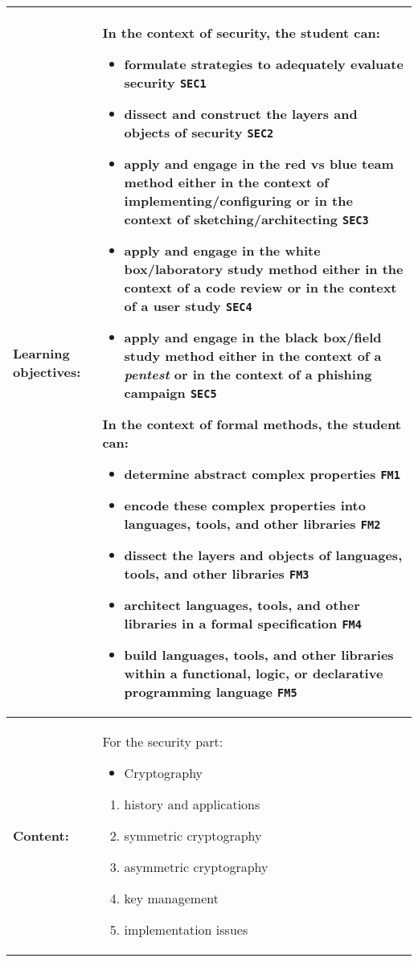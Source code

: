 \begin{tabularx}{\textwidth}{|>{\columncolor{lichtGrijs}} p{}|X|}
	\hline
	\textbf{Learning objectives:} &
	In the context of security, the student can:
	\begin{itemize}
		\item formulate strategies to adequately evaluate security \texttt{SEC1}
		\item dissect and construct the layers and objects of security \texttt{SEC2}
		\item apply and engage in the red vs blue team method either in the context of implementing/configuring or in the context of sketching/architecting \texttt{SEC3}
		\item apply and engage in the white box/laboratory study method either in the context of a code review or in the context of a user study \texttt{SEC4}
		\item apply and engage in the black box/field study method either in the context of a \textit{pentest} or in the context of a phishing campaign \texttt{SEC5}
	\end{itemize}

	In the context of formal methods, the student can:
	\begin{itemize}
		\item determine abstract complex properties \texttt{FM1}
		\item encode these complex properties into languages, tools, and other libraries \texttt{FM2}
		\item dissect the layers and objects of languages, tools, and other libraries \texttt{FM3}
		\item architect languages, tools, and other libraries in a formal specification \texttt{FM4}
		\item build languages, tools, and other libraries within a functional, logic, or declarative programming language \texttt{FM5}
	\end{itemize} \\
	\hline
	\textbf{Content:} &
	For the security part:
	\begin{itemize}
	\itemsep1pt\parskip0pt\parsep0pt
	\item
	  Cryptography
	\end{itemize}

	\begin{enumerate}
	\def\labelenumi{\arabic{enumi}.}
	\itemsep1pt\parskip0pt\parsep0pt
	\item
	  history and applications
	\item
	  symmetric cryptography
	\item
	  asymmetric cryptography
	\item
	  key management
	\item
	  implementation issues
	\end{enumerate}


\end{tabularx}
